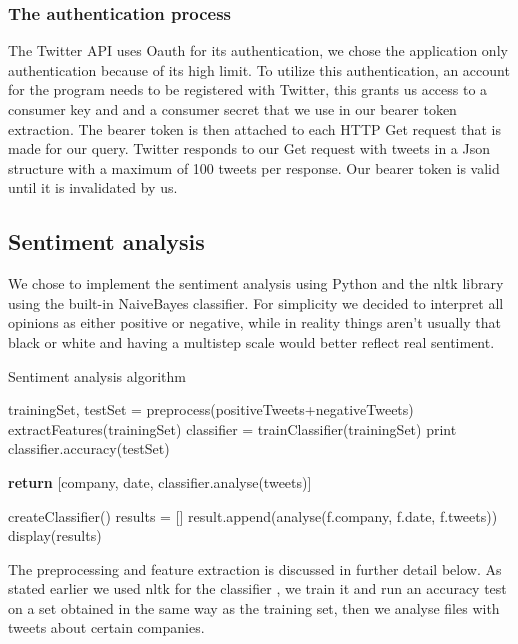 \documentclass[a4paper]{article}
\begin{document}
\subsubsection{The authentication process}
The Twitter API uses Oauth for its authentication, we chose the application only authentication because of its high limit. To utilize this authentication, an account for the program needs to be registered with Twitter, this grants us access to a consumer key and and a consumer secret that we use in our bearer token extraction. The bearer token is then attached to each HTTP Get request that is made for our query. Twitter responds to our Get request with tweets in a Json structure with a maximum of 100 tweets per response. Our bearer token is valid until it is invalidated by us.

\subsection{Sentiment analysis}
We chose to implement the sentiment analysis using Python and the nltk library \cite{nltk} using the built-in NaiveBayes classifier. For simplicity we decided to interpret all opinions as either positive or negative, while in reality things aren’t usually that black or white and having a multistep scale would better reflect real sentiment.

\begin{algorithm}
  \caption{Sentiment analysis algorithm}
  \begin{algorithmic}
      \State trainingSet, testSet = preprocess(positiveTweets+negativeTweets)
      \State extractFeatures(trainingSet)
      \State classifier = trainClassifier(trainingSet)
      \State print classifier.accuracy(testSet)
    \EndProcedure

      \State \textbf{return} [company, date, classifier.analyse(tweets)]
    \EndProcedure

      \State createClassifier()
      \State results = [] 
        \State result.append(analyse(f.company, f.date, f.tweets))
      \EndFor
      \State display(results)
    \EndProcedure
  \end{algorithmic}
\end{algorithm}

The preprocessing and feature extraction is discussed in further detail below. As stated earlier we used nltk for the classifier \cite{nltk_book}, we train it and run an accuracy test on a set obtained in the same way as the training set, then we analyse files with tweets about certain companies.
\end{document}

